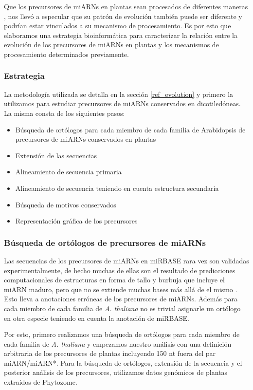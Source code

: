 Que los precursores de miARNs en plantas sean procesados de diferentes maneras \citep{Bologna2013}, nos llevó a especular que su patrón de evolución también puede ser diferente y podrían estar vinculados a su mecanismo de procesamiento.
Es por esto que elaboramos una estrategia bioinformática para caracterizar la relación entre la evolución de los precursores de miARNs en plantas y los mecanismos de procesamiento determinados previamente.

\subsubsection{Estrategia}

La metodología utilizada se detalla en la sección \ref{ref_evolution} y primero la utilizamos para estudiar precursores de miARNs conservados en dicotiledóneas. 
La misma consta de los siguientes pasos:

\begin{itemize}
    \item Búsqueda de ortólogos para cada miembro de cada familia de Arabidopsis de  precursores de miARNs conservados en plantas
    \item Extensión de las secuencias
    \item Alineamiento de secuencia primaria
    \item Alineamiento de secuencia teniendo en cuenta estructura secundaria
    \item Búsqueda de motivos conservados
    \item Representación gráfica de los precursores
\end{itemize}

\subsubsection{Búsqueda de ortólogos de precursores de miARNs}

Las secuencias de los precursores de miARNs en miRBASE rara vez son validadas experimentalmente, de hecho muchas de ellas son el resultado de predicciones computacionales de estructuras en forma de tallo y burbuja que incluye el miARN maduro, pero que no se extiende muchas bases más allá de el mismo \cite{Kozomara2014}.
Esto lleva a anotaciones erróneas de los precursores de miARNs.
Además para cada miembro de cada familia de \textit{A. thaliana} no es trivial asignarle un ortólogo en otra especie teniendo en cuenta la anotación de miRBASE.

Por esto, primero realizamos una búsqueda de ortólogos para cada miembro de cada familia de \textit{A. thaliana} y empezamos nuestro análisis con una definición arbitraria de los precursores de plantas incluyendo 150 nt fuera del par miARN/miARN*.
Para la búsqueda de ortólogos, extensión de la secuencia y el posterior análisis de los precursores, utilizamos datos genómicos de plantas extraídos de Phytozome. 

